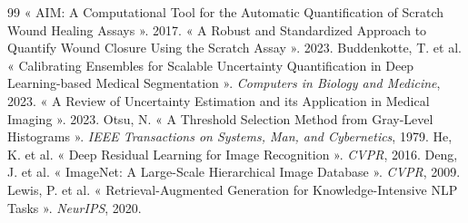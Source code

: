 \documentclass[12pt,a4paper]{report}
\begin{document}
\begin{thebibliography}{99}
 « AIM: A Computational Tool for the Automatic Quantification of Scratch Wound Healing Assays ». 2017.
 « A Robust and Standardized Approach to Quantify Wound Closure Using the Scratch Assay ». 2023.
 Buddenkotte, T. et al. « Calibrating Ensembles for Scalable Uncertainty Quantification in Deep Learning-based Medical Segmentation ». \textit{Computers in Biology and Medicine}, 2023.
 « A Review of Uncertainty Estimation and its Application in Medical Imaging ». 2023.
 Otsu, N. « A Threshold Selection Method from Gray-Level Histograms ». \textit{IEEE Transactions on Systems, Man, and Cybernetics}, 1979.
 He, K. et al. « Deep Residual Learning for Image Recognition ». \textit{CVPR}, 2016.
 Deng, J. et al. « ImageNet: A Large-Scale Hierarchical Image Database ». \textit{CVPR}, 2009.
 Lewis, P. et al. « Retrieval-Augmented Generation for Knowledge-Intensive NLP Tasks ». \textit{NeurIPS}, 2020.


\end{thebibliography}
\end{document}
